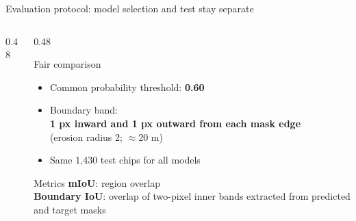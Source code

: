 \documentclass[aspectratio=169,10pt]{beamer}
\begin{document}
\begin{frame}{Evaluation protocol: model selection and test stay separate}
  \begin{columns}[c,onlytextwidth]
    \begin{column}{0.48\textwidth}
      \centering
    \end{column}
    \begin{column}{0.48\textwidth}
      \begin{block}{Fair comparison}
        \begin{itemize}
          \item Common probability threshold: \textbf{0.60}
          \item Boundary band:\\[-0.1em]
            \textbf{1 px inward and 1 px outward from each mask edge}\\[-0.1em]
            {\small (erosion radius 2; $\approx$20 m)}
          \item Same 1,430 test chips for all models
        \end{itemize}
      \end{block}
      \vspace{0.45em}
      \begin{block}{Metrics}
        \textbf{mIoU}: region overlap\\[0.35em]
        \textbf{Boundary IoU}: overlap of two-pixel inner bands extracted from predicted and target masks
      \end{block}
    \end{column}
  \end{columns}
\end{frame}
\end{document}
